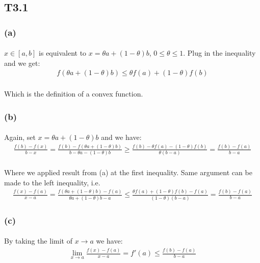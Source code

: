 \subsection*{T3.1}
\subsubsection*{(a)}
\paragraph{}
$x\in [a,b]$ is equivalent to $x=\theta a +(1-\theta)b$, $0\leq \theta \leq 1.$ Plug in the inequality and we get:
\begin{align*}
f(\theta a +(1-\theta)b) \leq \theta f(a) +(1-\theta)f(b)
\end{align*}
\paragraph{}
Which is the definition of a convex function.
\subsubsection*{(b)}
\paragraph{}
Again, set $x=\theta a +(1-\theta)b$ and we have:
\begin{align*}
\frac{f(b)-f(x)}{b-x} = \frac{f(b)-f(\theta a +(1-\theta)b)}{b-\theta a -(1-\theta)b} \geq \frac{f(b)-\theta f(a) -(1-\theta)f(b) }{\theta(b-a)}=\frac{f(b)-f(a)}{b-a}
\end{align*}
\paragraph{}
Where we applied result from (a) at the first inequality. Same argument can be made to the left inequality, i.e.
\begin{align*}
\frac{f(x)-f(a)}{x-a} = \frac{f(\theta a +(1-\theta)b)-f(a)}{\theta a +(1-\theta)b -a} \leq \frac{\theta f(a) +(1-\theta)f(b)-f(a) }{(1-\theta)(b-a)}=\frac{f(b)-f(a)}{b-a}
\end{align*}
\subsubsection*{(c)}
\paragraph{}
By taking the limit of $x \rightarrow a$ we have:
\begin{align*}
	\lim_{x \rightarrow a} \frac{f(x)-f(a)}{x-a} = f'(a) \leq \frac{f(b)-f(a)}{b-a}
\end{align*}
